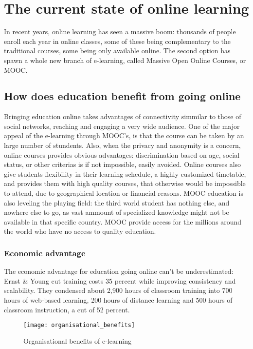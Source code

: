 \chapter{The current state of online learning}
%
In recent years, online learning has seen a massive boom: thousands of people
enroll each year in online classes, some of these being complementary to the
traditional courses, some being only available online. The second option has
spawn a whole new branch of e-learning, called Massive Open Online Courses, or
MOOC.

\section{How does education benefit from going online}
Bringing education online takes advantages of connectivity simmilar to those of
social networks, reaching and engaging a very wide audience.  One of the major
appeal of the e-learning through MOOC's, is that the course can be taken by an
large number of stundents.  Also, when the privacy and anonymity is a concern,
online courses provides obvious advantages: discrimination based on age, social status, or other
criterias is if not impossible, easily avoided. Online courses also give
students flexibility in their learning schedule, a highly customized timetable,
and provides them with high quality courses, that otherwise would be impossible
to attend, due to geographical location or financial reasons.
MOOC education is also leveling the playing field: the third world student has
nothing else, and nowhere else to go, as vast ammount of specialized knowledge
might not be available in that specific country. MOOC provide access for the
millions around the world who have no access to quality education.

\subsection{Economic advantage}
The economic advantage for education going
online can't be underestimated: Ernst \& Young cut training costs 35 percent
while improving consistency and scalability. They condensed about 2,900 hours of
classroom training into 700 hours of web-based learning, 200 hours of distance
learning and 500 hours of classroom instruction, a cut of 52
percent\citep{organisationalbenefits}.

\begin{figure}[htbp]
    \centering
    \texttt{[image: organisational\_benefits]}
    \caption[Benefits]{Organisational benefits of e-learning}
    \label{fig:Organisational benefits}
\end{figure}

